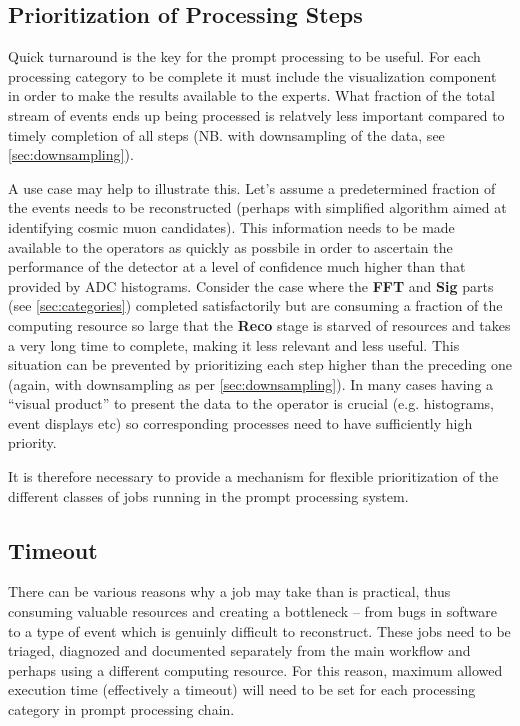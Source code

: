 \documentclass[pdftex,12pt,letter]{article}
\begin{document}
\subsection{Prioritization of Processing Steps}
\label{sec:priority}
Quick turnaround is the key for the prompt processing to be useful. For each processing category
to be complete it must include the visualization component in order to make the results available
to the experts. What fraction of the total stream of events ends up being processed is relatvely less
important compared to timely completion of all steps (NB. with downsampling of the data, see 
\ref{sec:downsampling}).

A use case may help to illustrate this. Let's assume a predetermined fraction of the events needs to
be reconstructed (perhaps with simplified algorithm aimed at identifying cosmic muon candidates).
This information needs to be made available to the operators as quickly as possbile in order to ascertain the performance
of the detector at a level of confidence much higher than that provided by ADC histograms.
Consider the case where the \textbf{FFT} and \textbf{Sig} parts (see \ref{sec:categories})
completed satisfactorily but are consuming a fraction of the computing resource so large that
the  \textbf{Reco} stage is starved of resources and takes a very long time to complete, making
it less relevant and less useful. This situation can be prevented by prioritizing each step higher
than the preceding one (again, with downsampling as per \ref{sec:downsampling}). In many
cases having a ``visual product'' to present the data to the operator is crucial (e.g. histograms,
event displays etc) so corresponding processes need to have sufficiently high priority.

It is therefore necessary to provide a mechanism for flexible prioritization of the different
classes of jobs running in the prompt processing system.

\subsection{Timeout}
There can be various reasons why a job may take than is practical, thus consuming valuable resources
and creating a bottleneck -- from bugs in software to a type of event which is genuinly difficult to reconstruct.
These jobs need to be triaged, diagnozed and documented separately from the main workflow and perhaps
using a different computing resource. For this reason, maximum allowed execution time (effectively a timeout)
will need to be set for each processing category in prompt processing chain.
\end{document}
